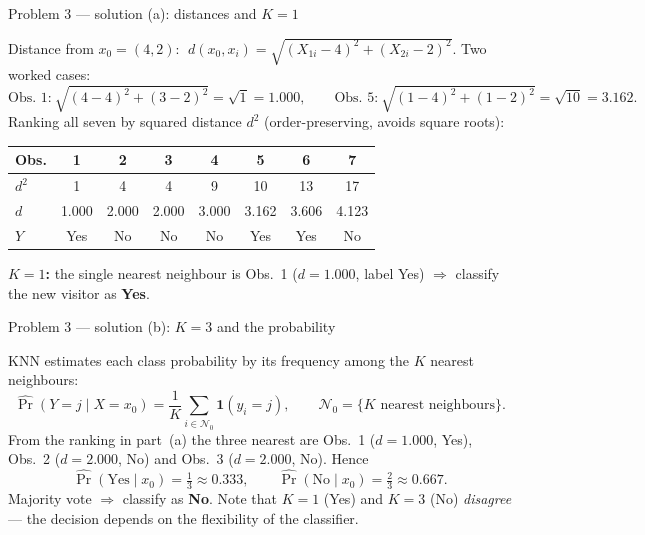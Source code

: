 \documentclass[aspectratio=169,11pt]{beamer}
\begin{document}
\begin{frame}{Problem 3 --- solution (a): distances and $K=1$}
  \begin{solutionbox}[Solution P3(a) --- Euclidean distances and {$K=1$} (4 P)]
    Distance from $x_0=(4,2)$: $\;d(x_0,x_i)=\sqrt{(X_{1i}-4)^2+(X_{2i}-2)^2}$. Two worked cases:
    \[
      \text{Obs.\ 1:}\ \sqrt{(4-4)^2+(3-2)^2}=\sqrt{1}=1.000,\qquad
      \text{Obs.\ 5:}\ \sqrt{(1-4)^2+(1-2)^2}=\sqrt{10}=3.162.
    \]
    Ranking all seven by squared distance $d^2$ (order-preserving, avoids square roots):
    \begin{center}\scriptsize
    \begin{tabular}{lccccccc}
      \toprule
      Obs. & 1 & 2 & 3 & 4 & 5 & 6 & 7\\
      \midrule
      $d^2$ & 1 & 4 & 4 & 9 & 10 & 13 & 17\\
      $d$ & 1.000 & 2.000 & 2.000 & 3.000 & 3.162 & 3.606 & 4.123\\
      $Y$ & Yes & No & No & No & Yes & Yes & No\\
      \bottomrule
    \end{tabular}
    \end{center}
    \textbf{$K=1$:} the single nearest neighbour is Obs.~1 ($d=1.000$, label Yes)
    $\Rightarrow$ classify the new visitor as \textbf{Yes}.
  \end{solutionbox}
\end{frame}

\begin{frame}{Problem 3 --- solution (b): $K=3$ and the probability}
  \begin{solutionbox}[Solution P3(b) --- majority vote with {$K=3$} (4 P)]
    KNN estimates each class probability by its frequency among the $K$ nearest neighbours:
    \[
      \widehat{\Pr}(Y=j\mid X=x_0)=\frac{1}{K}\sum_{i\in\mathcal N_0}\mathbf{1}(y_i=j),
      \qquad \mathcal N_0=\{\text{$K$ nearest neighbours}\}.
    \]
    From the ranking in part~(a) the three nearest are Obs.~1 ($d=1.000$, Yes),
    Obs.~2 ($d=2.000$, No) and Obs.~3 ($d=2.000$, No). Hence
    \[
      \widehat{\Pr}(\text{Yes}\mid x_0)=\tfrac{1}{3}\approx 0.333,\qquad
      \widehat{\Pr}(\text{No}\mid x_0)=\tfrac{2}{3}\approx 0.667.
    \]
    Majority vote $\Rightarrow$ classify as \textbf{No}. Note that $K=1$ (Yes) and $K=3$ (No)
    \emph{disagree} --- the decision depends on the flexibility of the classifier.
  \end{solutionbox}
\end{frame}
\end{document}
